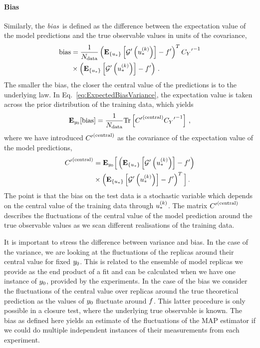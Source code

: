 \paragraph{Bias}

Similarly, the {\em bias}\ is defined as the difference between the expectation
value of the model predictions and the true observable values in units of the
covariance, \ie 
\begin{align}
    \label{eq:BiasDef}
    {\rm bias} &= \frac{1}{N_{\rm data}}
    \left( \mathbf{E}_{\{ u_* \}} \left[ {{\mathcal{G}}^{\prime}}\left(u_*^{(k)}\right) \right] - {{f}^{\prime}} \right)^T
    {{C_{Y}}^{\prime}}^{-1} \nonumber\\
    &\times\left( \mathbf{E}_{\{ u_* \}} \left[ {{\mathcal{G}}^{\prime}}\left(u_*^{(k)}\right) \right] - {{f}^{\prime}} \right)\, .
\end{align}
The smaller the bias, the closer the central value of the predictions is to the
underlying law. In Eq.~\ref{eq:ExpectedBiasVariance}, the expectation value is
taken across the prior distribution of the training data, which yields
\begin{equation}
    \mathbf{E}_{y_0}[{\rm bias}] = \frac{1}{N_{\rm data}}
    {\rm Tr} \left[ {{C}^{\prime}}^{(\rm central)} {{C_{Y}}^{\prime}}^{-1} \right]\, ,
\end{equation}
where we have introduced ${{C}^{\prime}}^{(\rm central)}$ as the covariance of the expectation value
of the model predictions,
\begin{align}
    \label{eq:CovCentDef}
    {{C}^{\prime}}^{(\rm central)} &= 
    \mathbf{E}_{y_0}\Big[
        \left( \mathbf{E}_{\{ u_* \}} \left[ {{\mathcal{G}}^{\prime}}\left(u_*^{(k)}\right) \right] - {{f}^{\prime}} \right) \nonumber \\
        &\times\left( \mathbf{E}_{\{ u_* \}} \left[ {{\mathcal{G}}^{\prime}}\left(u_*^{(k)}\right) \right] - {{f}^{\prime}} \right)^T   
    \Big]\, .
\end{align}
The point is that the bias on the test data is a stochastic variable which
depends on the central value of the training data through $u_*^{(k)}$. The
matrix ${{C}^{\prime}}^{(\rm central)}$ describes the fluctuations of the central value of the model
prediction around the true observable values as we scan different realisations
of the training data. 

It is important to stress the difference between variance and bias. In the case
of the variance, we are looking at the fluctuations of the replicas around their
central value for fixed $y_0$. This is related to the ensemble of
model replicas we provide as the end product of a fit and can be calculated when
we have one instance of $y_0$, provided by the experiments. In the
case of the bias we consider the fluctuations of the central value over replicas
around the true theoretical prediction as the values of $y_0$
fluctuate around $f$. This latter procedure is only possible in a closure
test, where the underlying true observable is known. The bias as defined here
yields an estimate of the fluctuations of the MAP estimator if we could do
multiple independent instances of their measurements from each experiment.

